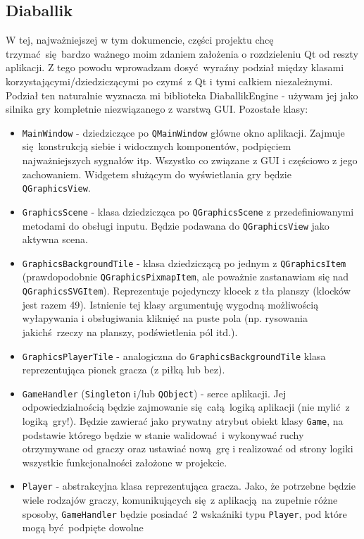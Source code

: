 \documentclass[a4paper,12pt]{article}
\begin{document}
\subsection{Diaballik}
W tej, najważniejszej w tym dokumencie, części projektu chcę trzymać się bardzo ważnego moim zdaniem założenia o rozdzieleniu Qt od reszty aplikacji.
Z tego powodu wprowadzam dosyć wyraźny podział między klasami korzystającymi/dziedziczącymi po czymś z Qt i tymi całkiem niezależnymi. Podział ten
naturalnie wyznacza mi biblioteka DiaballikEngine - używam jej jako silnika gry kompletnie niezwiązanego z warstwą GUI. Pozostałe klasy:
\begin{itemize}
 \item \verb|MainWindow| - dziedziczące po \verb|QMainWindow| główne okno aplikacji. Zajmuje się konstrukcją siebie i widocznych komponentów, 
 podpięciem najważniejszych sygnałów itp. Wszystko co związane z GUI i częściowo z jego zachowaniem. Widgetem służącym do wyświetlania gry będzie
 \verb|QGraphicsView|.
 \item \verb|GraphicsScene| - klasa dziedzicząca po \verb|QGraphicsScene| z przedefiniowanymi metodami do obsługi inputu. Będzie podawana do 
 \verb|QGraphicsView| jako aktywna scena. 
 \item \verb|GraphicsBackgroundTile| - klasa dziedziczącą po jednym z \verb|QGraphicsItem| (prawdopodobnie \verb|QGraphicsPixmapItem|, ale 
 poważnie zastanawiam się nad \verb|QGraphicsSVGItem|). Reprezentuje pojedynczy klocek z tła planszy (klocków jest razem 49). Istnienie tej klasy
 argumentuję wygodną możliwością wyłapywania i obsługiwania kliknięć na puste pola (np. rysowania jakichś rzeczy na planszy, podświetlenia pól
 itd.).
 \item \verb|GraphicsPlayerTile| - analogiczna do \verb|GraphicsBackgroundTile| klasa reprezentująca pionek gracza (z piłką lub bez).
 \item \verb|GameHandler| (\verb|Singleton| i/lub \verb|QObject|) - serce aplikacji. Jej odpowiedzialnością będzie zajmowanie się całą logiką
 aplikacji (nie mylić z logiką gry!). Będzie zawierać jako prywatny atrybut obiekt klasy \verb|Game|, na podstawie którego będzie w stanie 
 walidować i wykonywać ruchy otrzymywane od graczy oraz ustawiać nową grę i realizować od strony logiki wszystkie funkcjonalności założone
 w projekcie.
 \item \verb|Player| - abstrakcyjna klasa reprezentująca gracza. Jako, że potrzebne będzie wiele rodzajów graczy, komunikujących się z 
 aplikacją na zupełnie różne sposoby, \verb|GameHandler| będzie posiadać 2 wskaźniki typu \verb|Player|, pod które mogą być podpięte dowolne

\end{itemize}
\end{document}
